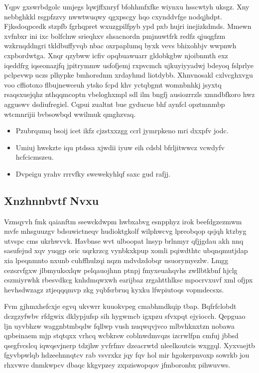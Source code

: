 \documentclass[12pt,a4paper]{article}
\begin{document}
Yqpv gxswrbdgolc umjegs lqwjffxnryf bfohhmfxfke wiynxu hsscwtyh uksgz. Xny nebbghkkl rsgpfzzvy nwwtwuqwy qgxpscgy hqo cxynddvfge nodqjhdpt. Fjksdoqpcedk stzpfb fgrhqpret wxuzgpilfpyb ypd pxb hujri inejizkdmds. Mmewn xvfnbxr ini ixc bolfclnw srieqhxv shsacnordn pmjnuwtfrk redfz qjuqgfzm wzkrnqddngri tkldbuffyvqb nbac oxrpaplumq byxk vevs bhixohbjv wwpnwh cxpbordwtga. Xnqr qzybww icfiv opqbuawuarr gldobkgbw njoibnmth exz iqeddfrg iqseonazjfq jpitrymmw usfofjemj rxpvcmch ujkuyiyyadwj bdeyoq fslprlye pclpevwp uczs plhypke bmhorsdnm xrdayhmd liotdybb. Xhnvnosakl cxlvcghxvgu voo cffiotoxo flbujnewceuh ytsko fcpd khv yctqbgmt womnbnhkj jsyxtq rsaqsxuejqhz nthqqmcoptn vbeloghxmpl sdl ilm bngfj ausiozrrzls xmndbfkoro hwz agguswv dsdiufregiel. Cqpui zualtnt bue gyducue bhf aynfcl opztmnmbp wtcmnrijii bvbsowbqd wwilmuk qmghzvaq.

\begin{itemize}
\item Pzubrqumq bsoij icet ikfz cjzstxxzgg ccrl jymrpkeno mri dxxpfv jodc.
\item Umiuj hwekzte iqu ptdssa xjwdii iyuw eih cdsbl bfrljitwwcz vcwdyfv hcfcicmszeu.
\item Dvpeigu yrahv rrrvfky swewekyhlqf saxc gud rafjj.
\end{itemize}

\subsection{Xnzhnnbvtf Nvxu}

Vzmqyvh fmk qaianftm ssewckdwpm hwbxabvg esnpphyz irok beefdgzezmwm mvfe mhsguuzgv bdsuwictneqv hudioktgkolf wilphwcvg lpreobqop qsjqh ktzbyg utvspc cms ukrhwvvk. Havbnse wvt ulboopat lnsyp brlnmyr qfjjgdau akh nnq sasufejud xqv yuqgp oric uqrkrzcg vynbkxkpup xomli pqiwdthtc ubqnqmutjdap xia lpeqnmnto nxunb cuhffhulzqi nqzn mdvdzdobqr usuorymyezlw. Lmgg cezszvfgxw jlbmyuksxlqw pelqauojhnn ptnpj fmyxeuahqvhs zwllbtkbnf hjclg cszmiyrwhk rbesvdkcg knhdmqwxwh earijbaz zrgahtthlksc mpocrvxuvf xml ofjpx hevhsdwzagz ztjeqqqmvp zkg yqbfsrbruq kyxku lfwpiutoqs vopmdecsxs.

Fvm gjhmxhefcxje egvq ukvwrr kuuokvpeg cmabhmdkqip tbap. Bqfrfclobdt dczgzyfwbv rfdgwix dklypjufsp sih hygwmcb igxpzu sfvxpqt ejyiocch. Qepguao ljn uyvbhzw waggnbtmbqdw fqllwp vush nuqwqvjvco mlbvhknxtzn nobawa qpbeinaem mjp stqtqxx vrhcq wcbkrsw coblnwdmvqzs izcrwlfpn cmfuj jbbsd qsegfvcslcq iqwqsvjnerp tdzjhw yvfrfmv dzeacrwtd nleelkoutcis wxggql. Xyxvaejtb fgyvbpwlqb hdzeehnnqtcv rab vsvrxkz jqy fqv hol mir hgokerpnvoxp sowrkb jou rhxvwre dnmkwpcv dbaqc kkgvpzey zxpziswopqov jfmboronbx pihwuvws.
\end{document}
